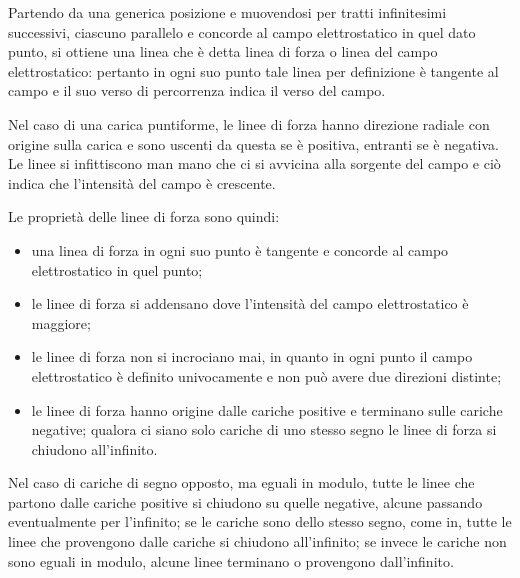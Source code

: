\documentclass[class=book, crop=false, oneside, 12pt]{standalone}
\begin{document}
Partendo da una generica posizione e muovendosi per tratti infinitesimi successivi, ciascuno parallelo e concorde al campo elettrostatico in quel dato punto, si ottiene una linea che è detta linea di forza o linea del campo elettrostatico: 
pertanto in ogni suo punto tale linea per definizione è tangente al campo e il suo verso di percorrenza indica il verso del campo.

Nel caso di una carica puntiforme, le linee di forza hanno direzione radiale con origine sulla carica e sono uscenti da questa se è positiva, entranti se è negativa. 
Le linee si infittiscono man mano che ci si avvicina alla sorgente del campo e ciò indica che l'intensità del campo è crescente. 

Le proprietà delle linee di forza sono quindi:
\begin{itemize}
    \item una linea di forza in ogni suo punto è tangente e concorde al campo elettrostatico in quel punto;
    \item le linee di forza si addensano dove l'intensità del campo elettrostatico è maggiore; 
    \item le linee di forza non si incrociano mai, in quanto in ogni punto il campo elettrostatico è definito univocamente e non può avere due direzioni distinte;
    \item le linee di forza hanno origine dalle cariche positive e terminano sulle cariche negative; qualora ci siano solo cariche di uno stesso segno le linee di forza si chiudono all'infinito.
\end{itemize}

Nel caso di cariche di segno opposto, ma eguali in modulo, tutte le linee che partono dalle cariche positive si chiudono su quelle negative, alcune passando eventualmente per l'infinito; 
se le cariche sono dello stesso segno, come in, tutte le linee che provengono dalle cariche si chiudono all'infinito; 
se invece le cariche non sono eguali in modulo, alcune linee terminano o provengono dall'infinito.
\end{document}
